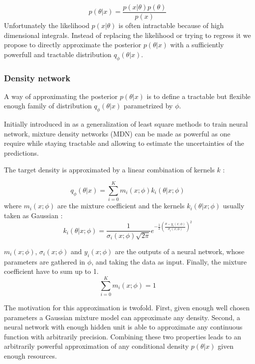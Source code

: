 \begin{equation}
    p(\theta | x) = \frac{p(x | \theta) p(\theta) }{p(x)}
\end{equation}
Unfortunately the likelihood $p(x | \theta)$ is often intractable because of high dimensional integrals.
Instead of replacing the likelihood or trying to regress it we propose to directly approximate the posterior $p(\theta | x)$ with a sufficiently powerfull and tractable distribution $q_\phi(\theta | x)$.


\subsubsection{Density network}


A way of approximating the posterior $p(\theta | x)$ is to define a tractable but flexible enough family of distribution $q_\phi(\theta | x)$ parametrized by $\phi$.

Initially introduced in \cite{Bishop94mixturedensity} as a generalization of least square methods to train neural network, mixture density networks (MDN) can be made as powerful as one require while staying tractable and allowing to estimate the uncertainties of the predictions.

The target density is approximated by a linear combination of kernels $k$ :

\begin{equation}
    q_\phi(\theta | x) = \sum_{i=0}^K m_i(x ; \phi) k_i(\theta | x ; \phi)
\end{equation}
where $m_i(x ; \phi)$ are the mixture coefficient
and the kernels $k_i(\theta | x ; \phi)$ usually taken as Gaussian :
\begin{equation}
    k_i(\theta | x ; \phi) = \frac{1}{\sigma_i(x ; \phi) \sqrt{2 \pi}} e^{- \frac{1}{2} \left ( \frac{\theta-y_i(x ; \phi)}{\sigma_i(x ; \phi)} \right )^2} 
\end{equation}

$m_i(x ; \phi)$, $\sigma_i(x ; \phi)$ and $y_i(x ; \phi)$ are the outputs of a neural network, whose parameters are gathered in $\phi$, and taking the data as input.
Finally, the mixture coefficient have to sum up to 1.
\begin{equation}
    \sum_{i=0}^K m_i(x ; \phi) =  1
\end{equation}

The motivation for this approximation is twofold.
First, given enough well chosen parameters a Gaussian mixture model can approximate any density.
Second, a neural network with enough hidden unit is able to approximate any continuous function with arbitrarily precision.
Combining these two properties leads to an arbitrarily powerful approximation of any conditional density $p(\theta|x)$ given enough resources.

